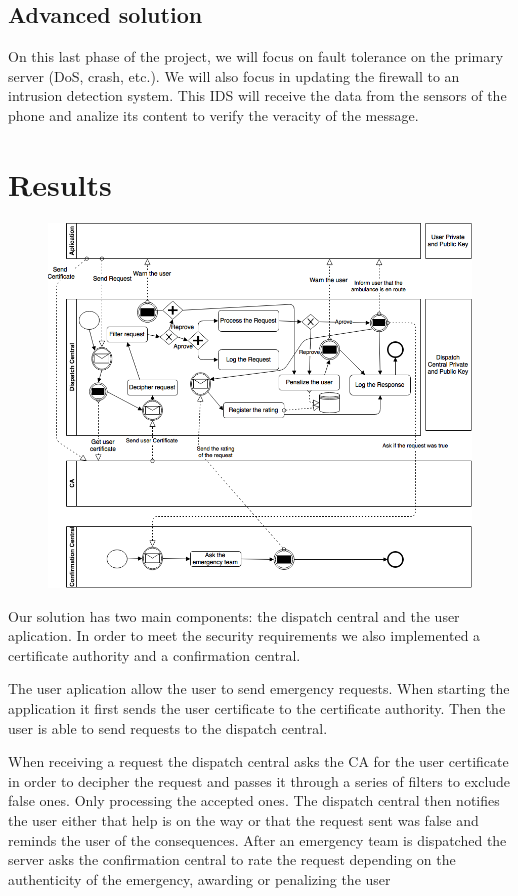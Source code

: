 \documentclass[a4paper,titlepage,11pt]{article}
\begin{document}
\subsection{Advanced solution}
On this last phase of the project, we will focus on fault tolerance on the primary server (DoS, crash, etc.).
We will also focus in updating the firewall to an intrusion detection system. This IDS will receive the data
from the sensors of the phone and analize its content to verify the veracity of the message.


\section{Results}
\begin{figure}[ht]
    \centering
    \includegraphics[scale=0.50]{img/advanced-solution.png}
\end{figure}

Our solution has two main components: the dispatch central and the user aplication.
In order to meet the security requirements we also implemented a certificate authority and a confirmation central.

The user aplication allow the user to send emergency requests. When starting the application it first sends
the user certificate to the certificate authority. Then the user is able to send requests to the dispatch central.

When receiving a request the dispatch central asks the CA for the user certificate in order to decipher the request and
passes it through a series of filters to exclude false ones. Only processing the accepted ones. The dispatch central then
notifies the user either that help is on the way or that the request sent was false and reminds the user of the consequences.
After an emergency team is dispatched the server asks the confirmation central to rate the request depending on the
authenticity of the emergency, awarding or penalizing the user
\end{document}
